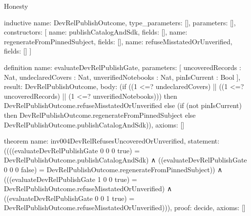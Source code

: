 \begin{lexlean}{Honesty}
\begin{semanticmodule}
inductive{
  name: DevRelPublishOutcome,
  type_parameters: [],
  parameters: [],
  constructors: [
    {name: publishCatalogAndSdk, fields: []},
    {name: regenerateFromPinnedSubject, fields: []},
    {name: refuseMisstatedOrUnverified, fields: []}
  ]
}

definition{
  name: evaluateDevRelPublishGate,
  parameters: [
    uncoveredRecords : Nat,
    undeclaredCovers : Nat,
    unverifiedNotebooks : Nat,
    pinIsCurrent : Bool
  ],
  result: DevRelPublishOutcome,
  body: (if ((1 <=? undeclaredCovers) || ((1 <=? uncoveredRecords) || (1 <=? unverifiedNotebooks)))
    then DevRelPublishOutcome.refuseMisstatedOrUnverified
    else (if (not pinIsCurrent)
      then DevRelPublishOutcome.regenerateFromPinnedSubject
      else DevRelPublishOutcome.publishCatalogAndSdk)),
  axioms: []
}

theorem{
  name: inv004DevRelRefusesUncoveredOrUnverified,
  statement: ((((evaluateDevRelPublishGate 0 0 0 true) = DevRelPublishOutcome.publishCatalogAndSdk)
    ∧ ((evaluateDevRelPublishGate 0 0 0 false) = DevRelPublishOutcome.regenerateFromPinnedSubject))
    ∧ (((evaluateDevRelPublishGate 1 0 0 true) = DevRelPublishOutcome.refuseMisstatedOrUnverified)
      ∧ ((evaluateDevRelPublishGate 0 0 1 true) = DevRelPublishOutcome.refuseMisstatedOrUnverified))),
  proof: decide{},
  axioms: []
}

\end{semanticmodule}
\end{lexlean}
